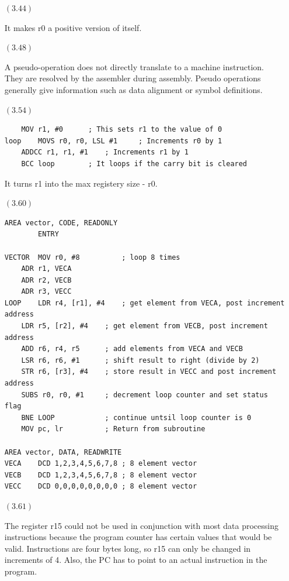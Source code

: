 \documentclass[letterpaper,10pt,titlepage]{article}
\begin{document}
\begin{enumerate}
  c. 
  \begin{lstlisting}
  (r0 << 12) - r0
  \end{lstlisting}

\item[$(3.44)$]

  It makes r0 a positive version of itself.

\item[$(3.48)$]

  A pseudo-operation does not directly translate to a machine instruction.  They are resolved by the assembler during assembly.
  Pseudo operations generally give information such as data alignment or symbol definitions.
  
\item[$(3.54)$]

\begin{lstlisting}
	MOV r1, #0 		; This sets r1 to the value of 0
loop	MOVS r0, r0, LSL #1 	; Increments r0 by 1
	ADDCC r1, r1, #1	; Increments r1 by 1
	BCC loop		; It loops if the carry bit is cleared
\end{lstlisting}

  It turns r1 into the max registery size - r0.

\item[$(3.60)$]

\begin{lstlisting}
AREA vector, CODE, READONLY
		ENTRY

VECTOR	MOV r0, #8			; loop 8 times
	ADR r1, VECA
	ADR r2, VECB
	ADR r3, VECC
LOOP	LDR r4, [r1], #4	; get element from VECA, post increment address
	LDR r5, [r2], #4	; get element from VECB, post increment address
	ADD r6, r4, r5		; add elements from VECA and VECB
	LSR r6, r6, #1		; shift result to right (divide by 2)
	STR r6, [r3], #4	; store result in VECC and post increment address
	SUBS r0, r0, #1		; decrement loop counter and set status flag
	BNE LOOP			; continue untsil loop counter is 0
	MOV pc, lr			; Return from subroutine
		
AREA vector, DATA, READWRITE
VECA	DCD 1,2,3,4,5,6,7,8 ; 8 element vector
VECB	DCD 1,2,3,4,5,6,7,8 ; 8 element vector
VECC	DCD 0,0,0,0,0,0,0,0 ; 8 element vector
\end{lstlisting}
  
\item[$(3.61)$]

  The register r15 could not be used in conjunction with most data processing instructions because the program counter has certain values that would be valid.
  Instructions are four bytes long, so r15 can only be changed in increments of 4.  Also, the PC has to point to an actual instruction in the program.
  
\end{enumerate}
\end{document}
